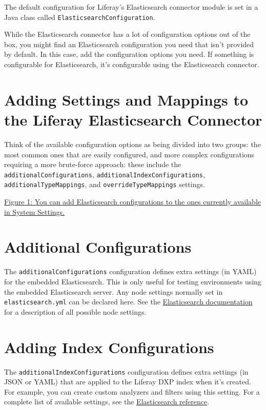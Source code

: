 The default configuration for Liferay's Elasticsearch connector module
is set in a Java class called \texttt{ElasticsearchConfiguration}.

While the Elasticsearch connector has a lot of configuration options out
of the box, you might find an Elasticsearch configuration you need that
isn't provided by default. In this case, add the configuration options
you need. If something is configurable for Elasticsearch, it's
configurable using the Elasticsearch connector.

\section{Adding Settings and Mappings to the Liferay Elasticsearch
Connector}\label{adding-settings-and-mappings-to-the-liferay-elasticsearch-connector}

Think of the available configuration options as being divided into two
groups: the most common ones that are easily configured, and more
complex configurations requiring a more brute-force approach: these
include the \texttt{additionalConfigurations},
\texttt{additionalIndexConfigurations}, \texttt{additionalTypeMappings},
and \texttt{overrideTypeMappings} settings.

\href{./images/cfg-elasticsearch-additional-configs.png}{Figure
1: You can add Elasticsearch configurations to the ones currently
available in System Settings.}

\section{Additional Configurations}\label{additional-configurations}

The \texttt{additionalConfigurations} configuration defines extra
settings (in YAML) for the embedded Elasticsearch. This is only useful
for testing environments using the embedded Elasticsearch server. Any
node settings normally set in \texttt{elasticsearch.yml} can be declared
here. See the
\href{https://www.elastic.co/guide/en/elasticsearch/reference/7.x/index.html}{Elasticsearch
documentation} for a description of all possible node settings.

\section{Adding Index Configurations}\label{adding-index-configurations}

The \texttt{additionalIndexConfigurations} configuration defines extra
settings (in JSON or YAML) that are applied to the Liferay DXP index
when it's created. For example, you can create custom analyzers and
filters using this setting. For a complete list of available settings,
see the
\href{https://www.elastic.co/guide/en/elasticsearch/reference/7.x/index-modules.html}{Elasticsearch
reference}.

